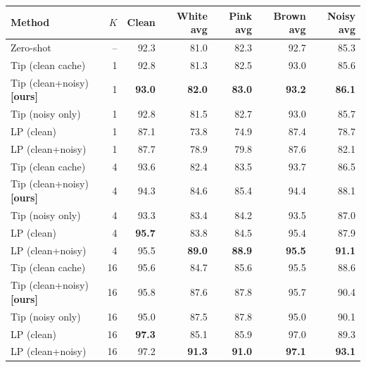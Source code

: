 \begin{tabular}{lrrrrrr}
\toprule
Method & $K$ & Clean & White avg & Pink avg & Brown avg & Noisy avg \\
\midrule
Zero-shot & -- & 92.3 & 81.0 & 82.3 & 92.7 & 85.3 \\
\midrule
Tip (clean cache) & 1 & 92.8 & 81.3 & 82.5 & 93.0 & 85.6 \\
Tip (clean+noisy) \textbf{[ours]} & 1 & \textbf{93.0} & \textbf{82.0} & \textbf{83.0} & \textbf{93.2} & \textbf{86.1} \\
Tip (noisy only) & 1 & 92.8 & 81.5 & 82.7 & 93.0 & 85.7 \\
LP (clean) & 1 & 87.1 & 73.8 & 74.9 & 87.4 & 78.7 \\
LP (clean+noisy) & 1 & 87.7 & 78.9 & 79.8 & 87.6 & 82.1 \\
\midrule
Tip (clean cache) & 4 & 93.6 & 82.4 & 83.5 & 93.7 & 86.5 \\
Tip (clean+noisy) \textbf{[ours]} & 4 & 94.3 & 84.6 & 85.4 & 94.4 & 88.1 \\
Tip (noisy only) & 4 & 93.3 & 83.4 & 84.2 & 93.5 & 87.0 \\
LP (clean) & 4 & \textbf{95.7} & 83.8 & 84.5 & 95.4 & 87.9 \\
LP (clean+noisy) & 4 & 95.5 & \textbf{89.0} & \textbf{88.9} & \textbf{95.5} & \textbf{91.1} \\
\midrule
Tip (clean cache) & 16 & 95.6 & 84.7 & 85.6 & 95.5 & 88.6 \\
Tip (clean+noisy) \textbf{[ours]} & 16 & 95.8 & 87.6 & 87.8 & 95.7 & 90.4 \\
Tip (noisy only) & 16 & 95.0 & 87.5 & 87.8 & 95.0 & 90.1 \\
LP (clean) & 16 & \textbf{97.3} & 85.1 & 85.9 & 97.0 & 89.3 \\
LP (clean+noisy) & 16 & 97.2 & \textbf{91.3} & \textbf{91.0} & \textbf{97.1} & \textbf{93.1} \\
\bottomrule
\end{tabular}